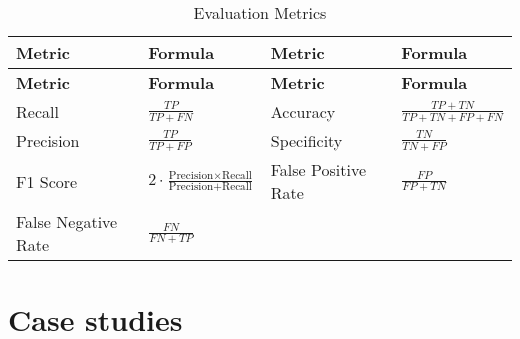 \begin{longtable}[]{@{}
  >{\raggedright\arraybackslash}p{}
  >{\raggedright\arraybackslash}p{}
  >{\raggedright\arraybackslash}p{}
  >{\raggedright\arraybackslash}p{}@{}}
\caption{Evaluation Metrics}\tabularnewline
\toprule\noalign{}
\begin{minipage}[b]{\linewidth}\raggedright
\textbf{Metric}
\end{minipage} & \begin{minipage}[b]{\linewidth}\raggedright
\textbf{Formula}
\end{minipage} & \begin{minipage}[b]{\linewidth}\raggedright
\textbf{Metric}
\end{minipage} & \begin{minipage}[b]{\linewidth}\raggedright
\textbf{Formula}
\end{minipage} \\
\midrule\noalign{}
\endfirsthead
\toprule\noalign{}
\begin{minipage}[b]{\linewidth}\raggedright
\textbf{Metric}
\end{minipage} & \begin{minipage}[b]{\linewidth}\raggedright
\textbf{Formula}
\end{minipage} & \begin{minipage}[b]{\linewidth}\raggedright
\textbf{Metric}
\end{minipage} & \begin{minipage}[b]{\linewidth}\raggedright
\textbf{Formula}
\end{minipage} \\
\midrule\noalign{}
\endhead
\bottomrule\noalign{}
\endlastfoot
Recall & \(\frac{TP}{TP + FN}\) & Accuracy & \(\frac{TP + TN}{TP + TN + FP + FN}\) \\
Precision & \(\frac{TP}{TP + FP}\) & Specificity & \(\frac{TN}{TN + FP}\) \\
F1 Score & \(2 \cdot \frac{\text{Precision} \times \text{Recall}}{\text{Precision} + \text{Recall}}\) & False Positive Rate & \(\frac{FP}{FP + TN}\) \\
False Negative Rate & \(\frac{FN}{FN + TP}\) & & \\
\end{longtable}

\section{Case studies}\label{sec-case}

